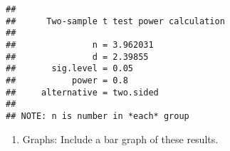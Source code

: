 \documentclass[
]{article}
\newenvironment{Shaded}{\begin{snugshade}}{\end{snugshade}}
\newcommand{\DataTypeTok}[1]{\textcolor[rgb]{0.13,0.29,0.53}{#1}}
\newcommand{\FloatTok}[1]{\textcolor[rgb]{0.00,0.00,0.81}{#1}}
\newcommand{\KeywordTok}[1]{\textcolor[rgb]{0.13,0.29,0.53}{\textbf{#1}}}
\newcommand{\NormalTok}[1]{#1}
\newcommand{\OperatorTok}[1]{\textcolor[rgb]{0.81,0.36,0.00}{\textbf{#1}}}
\newcommand{\OtherTok}[1]{\textcolor[rgb]{0.56,0.35,0.01}{#1}}
\newcommand{\StringTok}[1]{\textcolor[rgb]{0.31,0.60,0.02}{#1}}
\providecommand{\tightlist}{%
  \setlength{\itemsep}{0pt}\setlength{\parskip}{0pt}}
\begin{document}
\begin{Shaded}
\end{Shaded}

\begin{verbatim}
## 
##      Two-sample t test power calculation 
## 
##               n = 3.962031
##               d = 2.39855
##       sig.level = 0.05
##           power = 0.8
##     alternative = two.sided
## 
## NOTE: n is number in *each* group
\end{verbatim}

\begin{enumerate}
\def\labelenumi{\arabic{enumi})}
\setcounter{enumi}{3}
\tightlist
\item
  Graphs: Include a bar graph of these results.
\end{enumerate}
\end{document}
